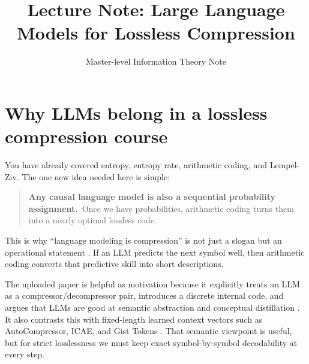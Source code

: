 \documentclass[11pt]{article}
\title{Lecture Note: Large Language Models for Lossless Compression}
\author{Master-level Information Theory Note}
\date{}
\theoremstyle{remark}
\begin{document}
\maketitle

\begin{center}
\end{center}

\section{Why LLMs belong in a lossless compression course}

You have already covered entropy, entropy rate, arithmetic coding, and Lempel-Ziv. The one new idea needed here is simple:

\begin{quote}
\textbf{Any causal language model is also a sequential probability assignment.}\
Once we have probabilities, arithmetic coding turns them into a nearly optimal lossless code.
\end{quote}

This is why ``language modeling is compression'' is not just a slogan but an operational statement \cite{deletang2024}. If an LLM predicts the next symbol well, then arithmetic coding converts that predictive skill into short descriptions.

The uploaded paper is helpful as motivation because it explicitly treats an LLM as a compressor/decompressor pair, introduces a discrete internal code, and argues that LLMs are good at semantic abstraction and conceptual distillation \cite{li2026}. It also contrasts this with fixed-length learned context vectors such as AutoCompressor, ICAE, and Gist Tokens \cite{chevalier2023,ge2024,mu2024}. That semantic viewpoint is useful, but for strict losslessness we must keep exact symbol-by-symbol decodability at every step.
\end{document}
